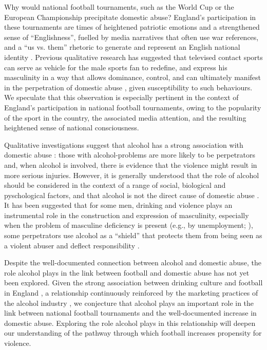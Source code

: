 \documentclass[12pt, a4paper]{article}
\begin{document}
Why would national football tournaments, such as the World Cup or the European Championship precipitate domestic abuse? England's participation in these tournaments are times of heightened patriotic emotions and a strengthened sense of ``Englishness'', fuelled by media narratives that often use war references, and a ``us vs. them'' rhetoric to generate and represent an English national identity \cite{Vincent2014}. Previous qualitative research has suggested that televised contact sports can serve as vehicle for the male sports fan to redefine, and express his masculinity in a way that allows dominance, control, and can ultimately manifest in the perpetration of domestic abuse \cite{Sabo,Swallow}, given susceptibility to such behaviours. We speculate that this observation is especially pertinent in the context of England's participation in national football tournaments, owing to the popularity of the sport in the country, the associated media attention, and the resulting heightened sense of national consciousness.

Qualitative investigations suggest that alcohol has a strong association with domestic abuse \cite{Peralta2010}: those with alcohol-problems are more likely to be perpetrators and, when alcohol is involved, there is evidence that the violence might result in more serious injuries. However, it is generally understood that the role of alcohol should be considered in the context of a range of social, biological and pyschological factors, and that alcohol is not the direct cause of domestic abuse \cite{Javaid2015,Peralta2010}. It has been suggested that for some men, drinking and violence plays an instrumental role in the construction and expression of masculinity, especially when the problem of masculine deficiency is present (e.g., by unemployment; ), some perpetrators use alcohol as a ``shield'' that protects them from being seen as a violent abuser and deflect responsibility \cite{Javaid2015}. 



Despite the well-documented connection between alcohol and domestic abuse, the role alcohol plays in the link between football and domestic abuse has not yet been explored. Given the strong association between drinking culture and football in England \cite{Dixon2014}, a relationship continuously reinforced by the marketing practices of the alcohol industry \cite{Gornall2014}, we conjecture that alcohol plays an important role in the link between national football tournaments and the well-documented increase in domestic abuse. Exploring the role alcohol plays in this relationship will deepen our understanding of the pathway through which football increases propensity for violence.
\end{document}
